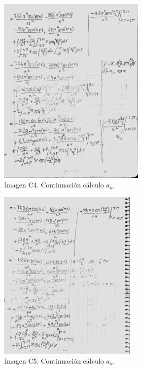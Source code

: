 \begin{figure}[H]
	\centering
	\includegraphics[width=2.84046in,height=3.66146in]{media/image14.jpg}
	\caption{Imagen C4. Continuación cálculo \(a_n\).}
\end{figure}

\begin{figure}[H]
	\centering
	\includegraphics[width=2.66175in,height=3.30729in]{media/image15.jpg}
	\caption{Imagen C5. Continuación cálculo \(a_n\).}
\end{figure}

